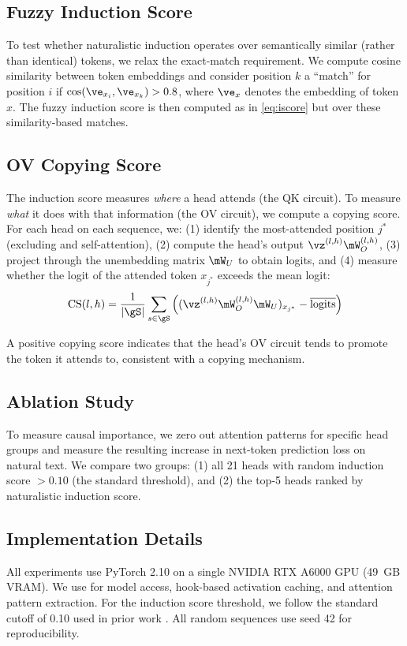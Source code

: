 \subsection{Fuzzy Induction Score}
\label{sec:fuzzy}

To test whether naturalistic induction operates over semantically similar (rather than identical) tokens, we relax the exact-match requirement.
We compute cosine similarity between token embeddings and consider position $k$ a ``match'' for position $i$ if $\cos(\ve_{x_i}, \ve_{x_k}) > 0.8$, where $\ve_{x}$ denotes the embedding of token $x$.
The fuzzy induction score is then computed as in \eqref{eq:iscore} but over these similarity-based matches.

\subsection{OV Copying Score}
\label{sec:copying}

The induction score measures \emph{where} a head attends (the QK circuit).
To measure \emph{what} it does with that information (the OV circuit), we compute a copying score.
For each head on each sequence, we: (1) identify the most-attended position $j^*$ (excluding \bos and self-attention), (2) compute the head's output $\vz^{(l,h)} \mW_O^{(l,h)}$, (3) project through the unembedding matrix $\mW_U$ to obtain logits, and (4) measure whether the logit of the attended token $x_{j^*}$ exceeds the mean logit:
\begin{equation}
    \cscore(l, h) = \frac{1}{|\gS|} \sum_{s \in \gS} \left( (\vz^{(l,h)} \mW_O^{(l,h)} \mW_U)_{x_{j^*}} - \overline{\text{logits}} \right)
    \label{eq:cscore}
\end{equation}

A positive copying score indicates that the head's OV circuit tends to promote the token it attends to, consistent with a copying mechanism.

\subsection{Ablation Study}
\label{sec:ablation}

To measure causal importance, we zero out attention patterns for specific head groups and measure the resulting increase in next-token prediction loss on natural text.
We compare two groups: (1) all 21 heads with random induction score $> 0.10$ (the standard threshold), and (2) the top-5 heads ranked by naturalistic induction score.

\subsection{Implementation Details}
\label{sec:implementation}

All experiments use PyTorch 2.10 on a single NVIDIA RTX A6000 GPU (49~GB VRAM).
We use \tlens for model access, hook-based activation caching, and attention pattern extraction.
For the induction score threshold, we follow the standard cutoff of 0.10 used in prior work \cite{olsson2022context}.
All random sequences use seed 42 for reproducibility.
